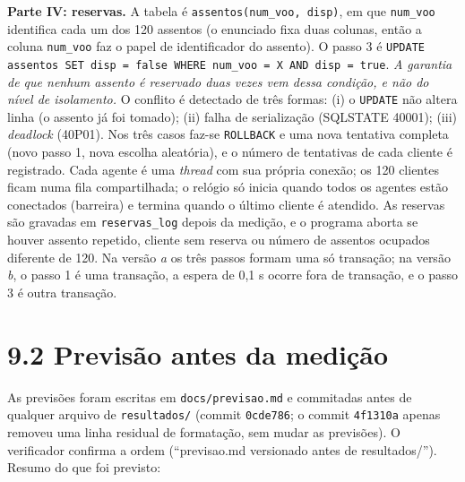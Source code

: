 \documentclass[11pt,a4paper]{article}
\newcommand{\tp}[1]{\texttt{#1}}
\begin{document}
\textbf{Parte IV: reservas.} A tabela é \tp{assentos(num\_voo, disp)}, em que \tp{num\_voo} identifica cada um dos 120 assentos (o enunciado fixa duas colunas, então a coluna \tp{num\_voo} faz o papel de identificador do assento). O passo 3 é \tp{UPDATE assentos SET disp = false WHERE num\_voo = X AND disp = true}. \emph{A garantia de que nenhum assento é reservado duas vezes vem dessa condição, e não do nível de isolamento.} O conflito é detectado de três formas: (i) o \tp{UPDATE} não altera linha (o assento já foi tomado); (ii) falha de serialização (SQLSTATE 40001); (iii) \emph{deadlock} (40P01). Nos três casos faz-se \tp{ROLLBACK} e uma nova tentativa completa (novo passo 1, nova escolha aleatória), e o número de tentativas de cada cliente é registrado. Cada agente é uma \emph{thread} com sua própria conexão; os 120 clientes ficam numa fila compartilhada; o relógio só inicia quando todos os agentes estão conectados (barreira) e termina quando o último cliente é atendido. As reservas são gravadas em \tp{reservas\_log} depois da medição, e o programa aborta se houver assento repetido, cliente sem reserva ou número de assentos ocupados diferente de 120. Na versão \emph{a} os três passos formam uma só transação; na versão \emph{b}, o passo 1 é uma transação, a espera de 0,1 s ocorre fora de transação, e o passo 3 é outra transação.

\section*{9.2 Previsão antes da medição}
As previsões foram escritas em \tp{docs/previsao.md} e commitadas antes de qualquer arquivo de \tp{resultados/} (commit \tp{0cde786}; o commit \tp{4f1310a} apenas removeu uma linha residual de formatação, sem mudar as previsões). O verificador confirma a ordem (``previsao.md versionado antes de resultados/''). Resumo do que foi previsto:
\end{document}

